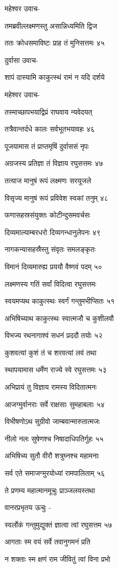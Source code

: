महेश्वर उवाच-

तमब्रवील्लक्ष्मणस्तु असान्निध्यमिति द्विज

ततः क्रोधसमाविष्टः प्राह तं मुनिसत्तमः ४५

दुर्वासा उवाच-

शापं दास्यामि काकुत्स्थं रामं न यदि दर्शये

महेश्वर उवाच-

तस्माच्छापभयाद्विप्रं राघवाय न्यवेदयत्

तत्रैवान्तर्दधे कालः सर्वभूतभयावहः ४६

पूजयामास तं प्राप्तमृषिं दुर्वाससं नृपः

अग्रजस्य प्रतिज्ञा तं विज्ञाय रघुसत्तमः ४७

तत्याज मानुषं रूपं लक्ष्मणः सरयूजले

विसृज्य मानुषं रूपं प्रविवेश स्वकां तनुम् ४८

फणासहस्रसंयुक्तः कोटीन्दुसमवर्चसः

दिव्यमाल्याम्बरधरो दिव्यगन्धानुलेपनः ४९

नागकन्यासहस्रैस्तु संवृतः समलङ्कृतः

विमानं दिव्यमारुह्य प्रययौ वैष्णवं पदम् ५०

लक्ष्मणस्य गतिं सर्वां विदित्वा रघुसत्तमः

स्वयमप्यथ काकुत्स्थः स्वर्गं गन्तुमभीप्सितः ५१

अभिषिच्याथ काकुत्स्थः स्वात्मजौ च कुशीलवौ

विभज्य रथनागाश्वं सधनं प्रददौ तयोः ५२

कुशवत्यां कुशं तं च शरवत्यां लवं तथा

स्थापयामास धर्मेण राज्ये स्वे रघुसत्तमः ५३

अभिप्रायं तु विज्ञाय रामस्य विदितात्मनः

आजग्मुर्वानराः सर्वे राक्षसाः सुमहाबलाः ५४

विभीषणोऽथ सुग्रीवो जाम्बवान्मारुतात्मजः

नीलो नलः सुषेणश्च निषादाधिपतिर्गुहः ५५

अभिषिच्य सुतौ वीरौ शत्रुघ्नश्च महामनाः

सर्व एते समाजग्मुरयोध्यां रामपालिताम् ५६

ते प्रणम्य महात्मानमूचुः प्राञ्जलयस्तथा

वानरप्रभृतय ऊचुः -

स्वर्लोकं गन्तुमुद्युक्तं ज्ञात्वा त्वां रघुसत्तम ५७

आगताः स्म वयं सर्वे तवानुगमनं प्रति

न शक्ताः स्म क्षणं राम जीवितुं त्वां विना प्रभो


